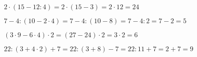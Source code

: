 \begin{alist}
\item $ 2\cdot(15-12:4)=2\cdot(15-3)=2\cdot 12=24 $
\item $ 7-4:(10-2\cdot 4)=7-4:(10-8)=7-4:2=7-2=5 $
\item $ (3\cdot 9-6\cdot 4)\cdot 2=(27-24)\cdot 2=3\cdot 2=6 $
\item $ 22:(3+4\cdot 2)+7=22:(3+8)-7=22:11+7=2+7=9 $
\end{alist}
